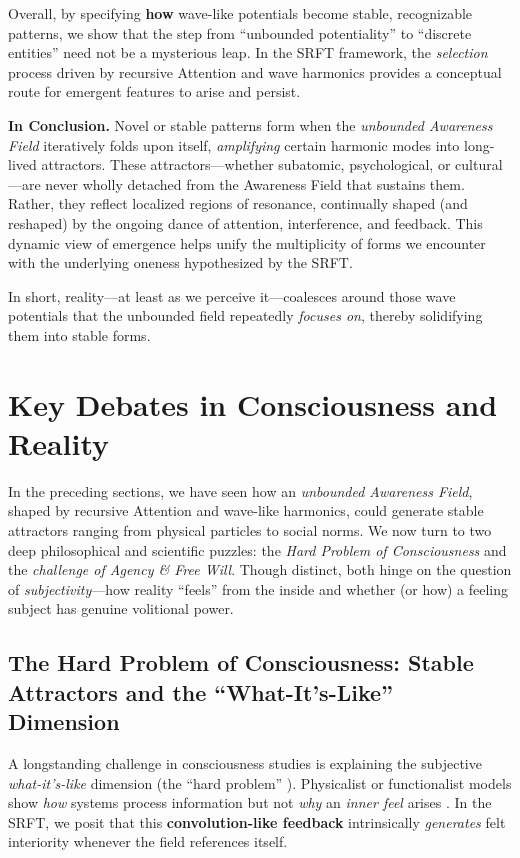 \documentclass[12pt,a4paper]{article}
\begin{document}
Overall, by specifying \textbf{how} wave-like potentials become stable, recognizable
patterns, we show that the step from “unbounded potentiality” to “discrete entities”
need not be a mysterious leap. In the SRFT framework, the \emph{selection} process
driven by recursive Attention and wave harmonics provides a conceptual route
for emergent features to arise and persist.

\medskip
\noindent
\textbf{In Conclusion.}  
Novel or stable patterns form when the \emph{unbounded Awareness Field} iteratively
folds upon itself, \emph{amplifying} certain harmonic modes into long-lived attractors.
These attractors---whether subatomic, psychological, or cultural---are never wholly
detached from the Awareness Field that sustains them. Rather, they reflect localized
regions of resonance, continually shaped (and reshaped) by the ongoing dance of
attention, interference, and feedback. This dynamic view of emergence helps unify
the multiplicity of forms we encounter with the underlying oneness hypothesized
by the SRFT.

In short, reality—at least as we perceive it—coalesces around those wave potentials that the unbounded field repeatedly \emph{focuses on}, thereby solidifying them into stable forms.

\section{Key Debates in Consciousness and Reality}
\label{sec:key-debates}

In the preceding sections, we have seen how an \emph{unbounded Awareness Field},
shaped by recursive Attention and wave-like harmonics, could generate stable
attractors ranging from physical particles to social norms. We now turn to two
deep philosophical and scientific puzzles: the \emph{Hard Problem of Consciousness}
and the \emph{challenge of Agency \& Free Will}. Though distinct, both hinge on
the question of \emph{subjectivity}—how reality “feels” from the inside and
whether (or how) a feeling subject has genuine volitional power.



\subsection{The Hard Problem of Consciousness: Stable Attractors and the ``What-It’s-Like'' Dimension}
\label{subsec:hard-problem-convolution}

A longstanding challenge in consciousness studies is explaining the subjective \emph{what-it’s-like} 
dimension (the “hard problem” \cite{chalmers1995}). Physicalist or functionalist models 
show \emph{how} systems process information but not \emph{why} an \emph{inner feel} arises \cite{nagel1974bat}. 
In the SRFT, we posit that this \textbf{convolution-like feedback} intrinsically \emph{generates} 
felt interiority whenever the field references itself.
\end{document}
